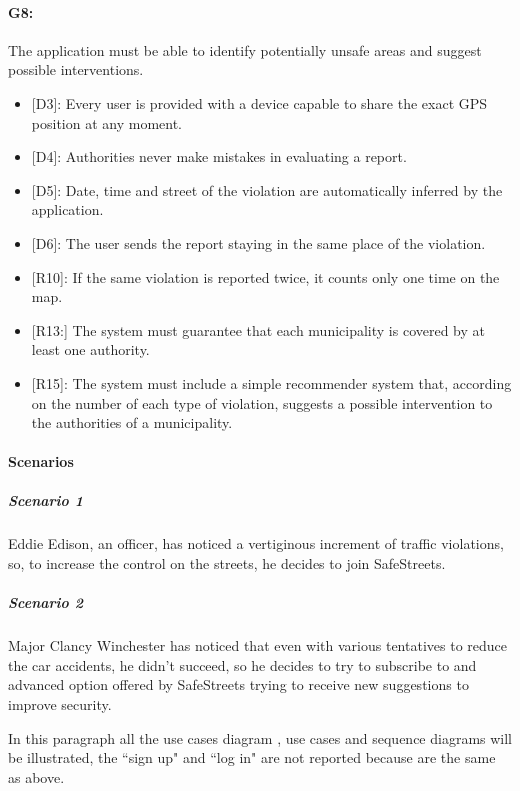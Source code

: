 \documentclass[12pt,a4paper]{report}
\begin{document}
			\paragraph {G8:} The application must be able to identify potentially unsafe areas and suggest possible interventions.
				\begin{itemize}
					\item{[D3]:} Every user is provided with a device capable to share the exact GPS position at any moment.
			 		\item{[D4]:} Authorities never make mistakes in evaluating a report.
					\item{[D5]:} Date, time and street of the violation are automatically inferred by the application.
			 		\item{[D6]:} The user sends the report staying in the same place of the violation.
				\end{itemize}
				\begin{itemize}
					\item{[R10]:} If the same violation is reported twice, it counts only one time on the map.
					\item{[R13:]} The system must guarantee that each municipality is covered by at least one authority.
					\item{[R15]:} The system must include a simple recommender system that, according on the number of each type of violation, suggests a possible intervention to the authorities of a municipality.
				\end{itemize}

\paragraph{Scenarios}
				\subparagraph{Scenario 1}
					Eddie Edison, an officer, has noticed a vertiginous increment of traffic violations, so, to increase the control
					on the streets, he decides to join SafeStreets.
					
				\subparagraph{Scenario 2}
					Major Clancy Winchester has noticed that even with various tentatives to reduce the car accidents, he didn't
					succeed, so he decides to try to subscribe to and advanced option offered by SafeStreets trying to receive
					new suggestions to improve security.
					
				In this paragraph all the use cases diagram , use cases and sequence diagrams will be illustrated, the ``sign up" and ``log in"
				are not reported because are the same as above.
\end{document}
